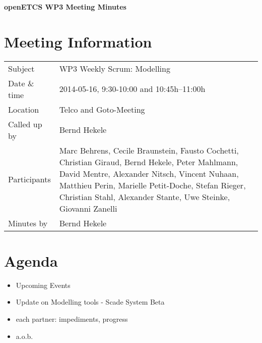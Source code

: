 \documentclass[a4paper, 11pt]{article}
\begin{document}
{\begin{center}\huge\bf openETCS WP3 Meeting Minutes\end{center}}
\section{Meeting Information}

\renewcommand{\arraystretch}{1.5}
\begin{supertabular}{m{.2\textwidth}m{.8\textwidth}}
Subject & WP3 Weekly Scrum: Modelling\\
Date \& time & 2014-05-16, 9:30-10:00 and 10:45h--11:00h\\
Location & Telco and Goto-Meeting\\
Called up by & Bernd Hekele\\
Participants &
Marc Behrens,
Cecile Braunstein,
Fausto Cochetti,
Christian Giraud,
Bernd Hekele,
Peter Mahlmann,
David Mentre,
Alexander Nitsch,
Vincent Nuhaan,
Matthieu Perin,
Marielle Petit-Doche,
Stefan Rieger,
Christian Stahl,
Alexander Stante,
Uwe Steinke,
Giovanni Zanelli
\\

Minutes by & Bernd Hekele\\
\end{supertabular}
\renewcommand{\arraystretch}{1.0}


\section{{Agenda}}
\begin{itemize}
\item Upcoming Events
\item Update on Modelling tools - Scade System Beta
\item each partner: impediments, progress
\item a.o.b.
\end{itemize}
\end{document}
